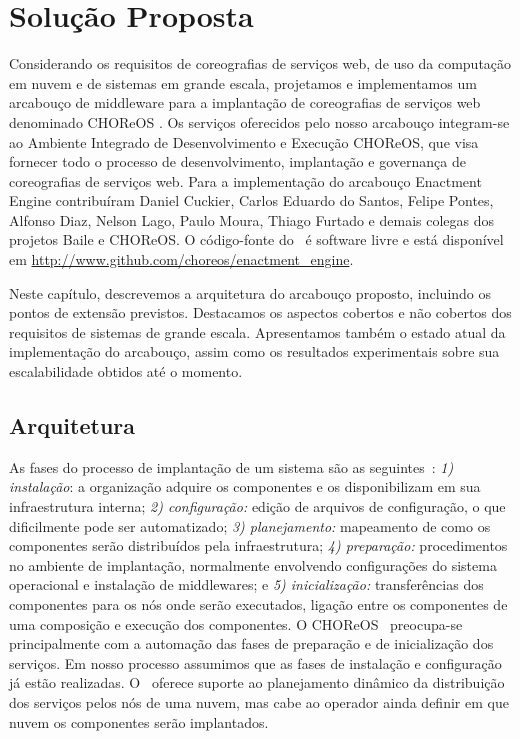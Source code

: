 
\chapter{Solução Proposta}
\label{cap:solucao}

Considerando os requisitos de coreografias de serviços web, de uso da computação em nuvem e de sistemas em grande escala, projetamos e implementamos um arcabouço de middleware para a implantação de coreografias de serviços web denominado CHOReOS \ee. Os serviços oferecidos pelo nosso arcabouço integram-se ao Ambiente Integrado de Desenvolvimento e Execução CHOReOS, que visa fornecer todo o processo de desenvolvimento, implantação e governança de coreografias de serviços web. Para a implementação do arcabouço Enactment Engine contribuíram Daniel Cuckier, Carlos Eduardo do Santos, Felipe Pontes, Alfonso Diaz, Nelson Lago, Paulo Moura, Thiago Furtado e demais colegas dos projetos Baile e CHOReOS. O código-fonte do \ee\ é software livre 
e está disponível em \url{http://www.github.com/choreos/enactment\_engine}. 

Neste capítulo, descrevemos a arquitetura do arcabouço proposto, incluindo os pontos de extensão previstos. Destacamos os aspectos cobertos e não cobertos dos requisitos de sistemas de grande escala. Apresentamos também o estado atual da implementação do arcabouço, assim como os resultados experimentais sobre sua escalabilidade obtidos até o momento.

\section{Arquitetura}
\label{sec:arquitetura}

As fases do processo de implantação de um sistema são as seguintes~\cite{DEPL2006}:
\emph{1) instalação}: a organização adquire os componentes e os disponibilizam em sua infraestrutura interna; 
\emph{2) configuração:} edição de arquivos de configuração, o que dificilmente pode ser automatizado; 
\emph{3) planejamento:} mapeamento de como os componentes serão distribuídos pela infraestrutura; 
\emph{4) preparação:} procedimentos no ambiente de implantação, normalmente envolvendo configurações do sistema operacional e instalação de middlewares; e
\emph{5) inicialização:} transferências dos componentes para os nós onde serão executados, ligação entre os componentes de uma composição e execução dos componentes.
O CHOReOS \ee\ preocupa-se principalmente com a automação das fases de preparação e de inicialização dos serviços. Em nosso processo assumimos que as fases de instalação e configuração já estão realizadas. O \ee\ oferece suporte ao planejamento dinâmico da distribuição dos serviços pelos nós de uma nuvem, mas cabe ao operador ainda definir em que nuvem os componentes serão implantados.


